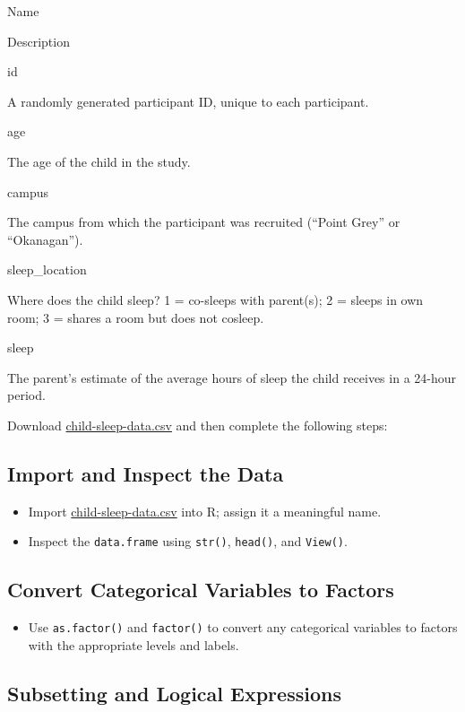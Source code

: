 \documentclass[
]{book}
\providecommand{\tightlist}{%
  \setlength{\itemsep}{0pt}\setlength{\parskip}{0pt}}
\begin{document}
Name

Description

id

A randomly generated participant ID, unique to each participant.

age

The age of the child in the study.

campus

The campus from which the participant was recruited (``Point Grey'' or ``Okanagan'').

sleep\_location

Where does the child sleep? 1 = co-sleeps with parent(s); 2 = sleeps in own room; 3 = shares a room but does not cosleep.

sleep

The parent's estimate of the average hours of sleep the child receives in a 24-hour period.

Download \href{assets/data/child-sleep-data.csv}{child-sleep-data.csv} and then complete the following steps:

\hypertarget{import-and-inspect-the-data}{%
\subsection{Import and Inspect the Data}\label{import-and-inspect-the-data}}

\begin{itemize}
\tightlist
\item
  Import \href{assets/data/child-sleep-data.csv}{child-sleep-data.csv} into R; assign it a meaningful name.
\item
  Inspect the \texttt{data.frame} using \texttt{str()}, \texttt{head()}, and \texttt{View()}.
\end{itemize}

\hypertarget{convert-categorical-variables-to-factors}{%
\subsection{Convert Categorical Variables to Factors}\label{convert-categorical-variables-to-factors}}

\begin{itemize}
\tightlist
\item
  Use \texttt{as.factor()} and \texttt{factor()} to convert any categorical variables to factors with the appropriate levels and labels.
\end{itemize}

\hypertarget{subsetting-and-logical-expressions}{%
\subsection{Subsetting and Logical Expressions}\label{subsetting-and-logical-expressions}}
\end{document}
